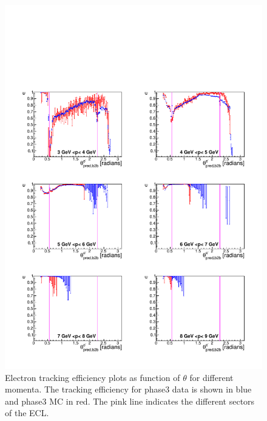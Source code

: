 \documentclass[a4paper,11pt,twosided,final,german,openbib,pdftex,listof=totoc,bibliography=totoc]{scrbook}
\begin{document}
\begin{figure}[!htbp]
	\centering
	\includegraphics[width=\textwidth]{Plots/master3/xPMThetaemP3}
	\caption[Momentum $\theta$ Electron Efficiency Phase3]{Electron tracking efficiency plots as function of $\theta$ for different momenta. The tracking efficiency for phase3 data is shown in blue and phase3 MC in red. The pink line indicates the different sectors of the ECL.}
	
	\label{plt:xPMThetaem3}
\end{figure}
\end{document}
